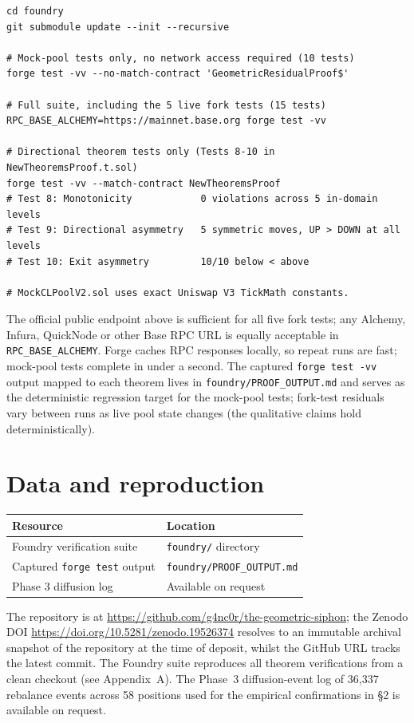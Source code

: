 \documentclass[11pt,a4paper]{article}
\theoremstyle{definition}
\begin{document}
\begin{verbatim}
cd foundry
git submodule update --init --recursive

# Mock-pool tests only, no network access required (10 tests)
forge test -vv --no-match-contract 'GeometricResidualProof$'

# Full suite, including the 5 live fork tests (15 tests)
RPC_BASE_ALCHEMY=https://mainnet.base.org forge test -vv

# Directional theorem tests only (Tests 8-10 in NewTheoremsProof.t.sol)
forge test -vv --match-contract NewTheoremsProof
# Test 8: Monotonicity            0 violations across 5 in-domain levels
# Test 9: Directional asymmetry   5 symmetric moves, UP > DOWN at all levels
# Test 10: Exit asymmetry         10/10 below < above

# MockCLPoolV2.sol uses exact Uniswap V3 TickMath constants.
\end{verbatim}

\noindent The official public endpoint above is sufficient for all five fork tests; any Alchemy, Infura, QuickNode or other Base RPC URL is equally acceptable in \texttt{RPC\_BASE\_ALCHEMY}. Forge caches RPC responses locally, so repeat runs are fast; mock-pool tests complete in under a second. The captured \texttt{forge test -vv} output mapped to each theorem lives in \texttt{foundry/PROOF\_OUTPUT.md} and serves as the deterministic regression target for the mock-pool tests; fork-test residuals vary between runs as live pool state changes (the qualitative claims hold deterministically).

\section{Data and reproduction}

\begin{table}[H]
\centering
\begin{tabular}{@{}ll@{}}
\toprule
Resource & Location \\
\midrule
Foundry verification suite & \texttt{foundry/} directory \\
Captured \texttt{forge test} output & \texttt{foundry/PROOF\_OUTPUT.md} \\
Phase 3 diffusion log & Available on request \\
\bottomrule
\end{tabular}
\end{table}

\noindent The repository is at \url{https://github.com/g4nc0r/the-geometric-siphon}; the Zenodo DOI \url{https://doi.org/10.5281/zenodo.19526374} resolves to an immutable archival snapshot of the repository at the time of deposit, whilst the GitHub URL tracks the latest commit. The Foundry suite reproduces all theorem verifications from a clean checkout (see Appendix~A). The Phase~3 diffusion-event log of 36{,}337 rebalance events across 58 positions used for the empirical confirmations in \S2 is available on request.
\end{document}
